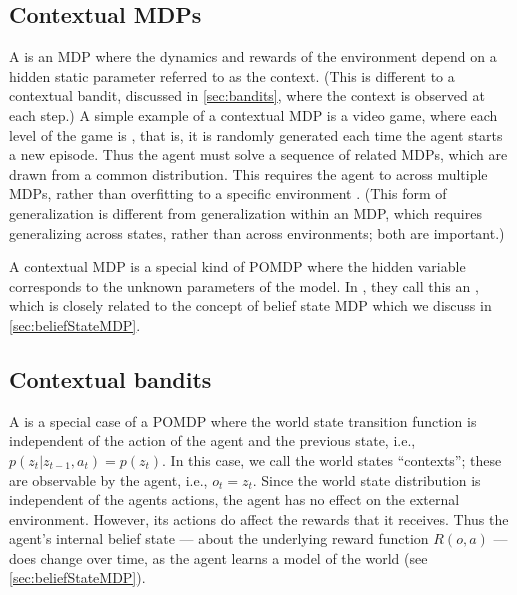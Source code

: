 \subsection{Contextual MDPs}

A  \citep{Hallak2015}
is an MDP where the 
dynamics and rewards of the environment depend on a
hidden static parameter referred to as the context.
(This is different to a contextual bandit, discussed in \cref{sec:bandits},
where the context is observed at each step.)
A simple example of a contextual MDP is a
video game, where each level of the game
is ,
that is, it is randomly generated each time
the agent starts a new episode.
Thus the agent must solve a sequence of
related MDPs, which are drawn from a common distribution.
This requires the agent to  across multiple MDPs,
rather than overfitting to a specific environment
\citep{Cobbe2019,Kirk2021,Tomilin2022}.
(This form of generalization is different
from generalization within an MDP,
which requires generalizing across states,
rather than across environments; both are important.)

A contextual MDP is a special kind of POMDP
where the hidden variable corresponds to the unknown
parameters of the model.
In \citep{Ghosh2021RL}, they call this an ,
which is closely related to the concept
of belief state MDP which we discuss in \cref{sec:beliefStateMDP}.




\subsection{Contextual bandits}
\label{sec:contextualBandit}
\label{sec:bandits}

A  is a special case of a POMDP
where the world state transition function is independent of the
action of the agent and the previous state,
i.e., $p(z_t|z_{t-1},a_t) = p(z_t)$.
In this case, we call the world states ``contexts'';
these are observable by the agent, i.e., $o_t=z_t$.
Since the world state distribution is independent of the agents actions,
the agent has no effect on the external
environment.
However, its actions do affect  the rewards that it
receives. Thus the agent's internal belief state --- about the underlying
reward function $R(o,a)$ --- does change over time,
as the agent learns a model of the world
(see \cref{sec:beliefStateMDP}).



